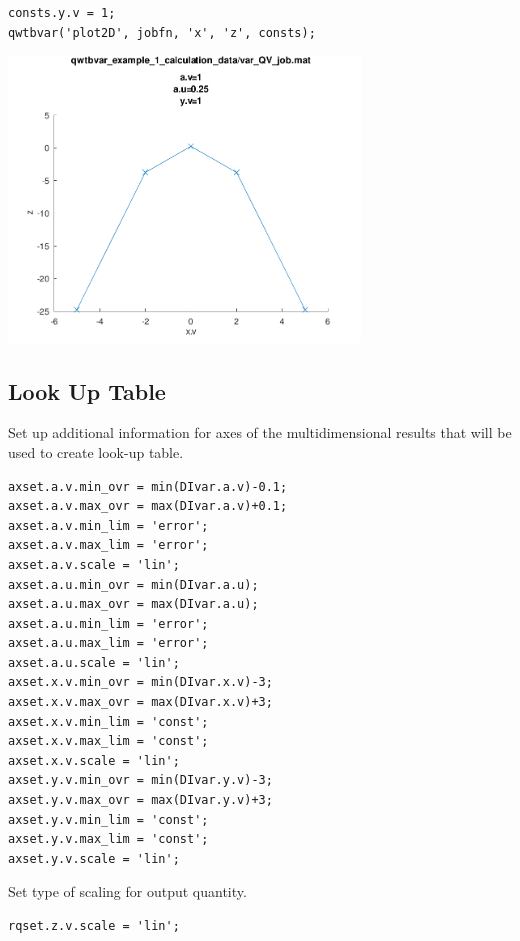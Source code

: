 \begin{lstlisting}
consts.y.v = 1;
qwtbvar('plot2D', jobfn, 'x', 'z', consts);
\end{lstlisting}
\begin{center}
\includegraphics[width=0.7\textwidth]{qwtb_examples_published/qwtbvar_example_1-2.pdf}
\end{center}


{}
\subsection*{Look Up Table}



Set up additional information for axes of the multidimensional results that
will be used to create look-up table.

\begin{lstlisting}
axset.a.v.min_ovr = min(DIvar.a.v)-0.1;
axset.a.v.max_ovr = max(DIvar.a.v)+0.1;
axset.a.v.min_lim = 'error';
axset.a.v.max_lim = 'error';
axset.a.v.scale = 'lin';
axset.a.u.min_ovr = min(DIvar.a.u);
axset.a.u.max_ovr = max(DIvar.a.u);
axset.a.u.min_lim = 'error';
axset.a.u.max_lim = 'error';
axset.a.u.scale = 'lin';
axset.x.v.min_ovr = min(DIvar.x.v)-3;
axset.x.v.max_ovr = max(DIvar.x.v)+3;
axset.x.v.min_lim = 'const';
axset.x.v.max_lim = 'const';
axset.x.v.scale = 'lin';
axset.y.v.min_ovr = min(DIvar.y.v)-3;
axset.y.v.max_ovr = max(DIvar.y.v)+3;
axset.y.v.min_lim = 'const';
axset.y.v.max_lim = 'const';
axset.y.v.scale = 'lin';
\end{lstlisting}


Set type of scaling for output quantity.

\begin{lstlisting}
rqset.z.v.scale = 'lin';
\end{lstlisting}


